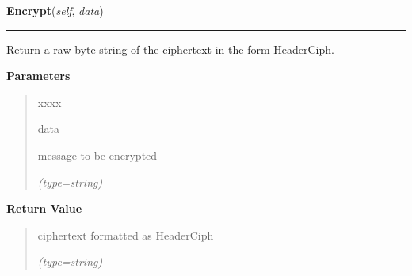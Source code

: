 \hspace{.8\funcindent}\begin{boxedminipage}{\funcwidth}

    \raggedright \textbf{Encrypt}(\textit{self}, \textit{data})

    \vspace{-1.5ex}

    \rule{\textwidth}{0.5\fboxrule}
\setlength{\parskip}{2ex}
    Return a raw byte string of the ciphertext in the form 
    Header{\textbar}Ciph.

\setlength{\parskip}{1ex}
      \textbf{Parameters}
      \vspace{-1ex}

      \begin{quote}
        \begin{Ventry}{xxxx}

          \item[data]

          message to be encrypted

            {\it (type=string)}

        \end{Ventry}

      \end{quote}

      \textbf{Return Value}
    \vspace{-1ex}

      \begin{quote}
      ciphertext formatted as Header{\textbar}Ciph

      {\it (type=string)}

      \end{quote}

    \end{boxedminipage}

    \label{keyczar:keys:RsaPublicKey:Verify}

    \vspace{0.5ex}

